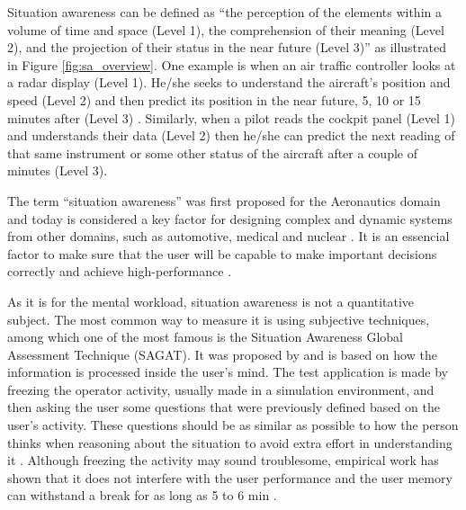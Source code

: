 Situation awareness can be defined as “the perception of the elements within a volume of time and space (Level 1), the comprehension of their meaning (Level 2), and the projection of their status in the near future (Level 3)” as illustrated in Figure \ref{fig:sa_overview}. One example is when an air traffic controller looks at a radar display (Level 1). He/she seeks to understand the aircraft's position and speed (Level 2) and then predict its position in the near future, 5, 10 or 15 minutes after (Level 3) \cite{sanders1998human}. Similarly, when a pilot reads the cockpit panel (Level 1) and understands their data (Level 2) then he/she can predict the next reading of that same instrument or some other status of the aircraft after a couple of minutes (Level 3).



The term “situation awareness” was first proposed for the Aeronautics domain and today is considered a key factor for designing complex and dynamic systems from other domains, such as automotive, medical and nuclear \cite{endsley1995measurement}. It is an essencial factor to make sure that the user will be capable to make important decisions correctly and achieve high-performance \cite{endsley1988design, endsley2018automation}.

As it is for the mental workload, situation awareness is not a quantitative subject. The most common way to measure it is using subjective techniques, among which one of the most famous is the Situation Awareness Global Assessment Technique (SAGAT). It was proposed by \cite{endsley1988design} and is based on how the information is processed inside the user’s mind. The test application is made by freezing the operator activity, usually made in a simulation environment, and then asking the user some questions that were previously defined based on the user's activity. These questions should be as similar as possible to how the person thinks when reasoning about the situation to avoid extra effort in understanding it \cite{stanton2004handbook}.  Although freezing the activity may sound troublesome, empirical work has shown that it does not interfere with the user performance and the user memory can withstand a break for as long as 5 to 6 min \cite{endsley1988design}.
